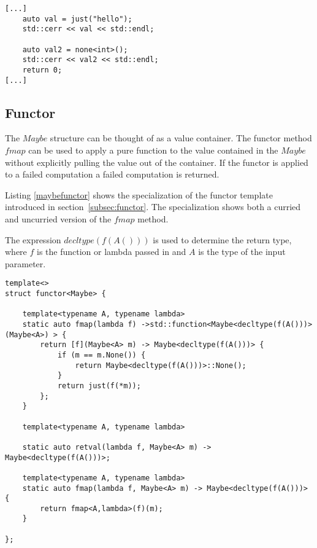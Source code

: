 \documentclass[12pt,fleqn]{article}
\begin{document}
%
%
%

%
%

\begin{minipage}{\linewidth}
\begin{lstlisting}[caption=Example of the use of Maybe, label=maybeexample]
[...]
	auto val = just("hello");
	std::cerr << val << std::endl;

	auto val2 = none<int>();
	std::cerr << val2 << std::endl;
	return 0;
[...]
\end{lstlisting}
\end{minipage}

%
%
\subsection{Functor}
%
%

The $Maybe$ structure can be thought of as a value container.
The functor method $fmap$ can be used to apply a pure function to the value contained in the $Maybe$ 
without explicitly pulling the value out of the container.
If the functor is applied to a failed computation a failed computation is returned.

Listing \ref{maybefunctor} shows the specialization of the functor template introduced in section~\ref{subsec:functor}.
The specialization shows both a curried and uncurried version of the $fmap$ method.

The expression $decltype(f(A()))$ is used to determine the return type, where $f$ is the function or lambda passed in 
and $A$ is the type of the input parameter.


%
%
\begin{minipage}{\linewidth}
\begin{lstlisting}[caption=Maybe Functor, label=maybefunctor]
template<>
struct functor<Maybe> {

	template<typename A, typename lambda>
	static auto fmap(lambda f) ->std::function<Maybe<decltype(f(A()))> (Maybe<A>) > {
		return [f](Maybe<A> m) -> Maybe<decltype(f(A()))> {
			if (m == m.None()) {
				return Maybe<decltype(f(A()))>::None();
			}
			return just(f(*m));
		};
	}

	template<typename A, typename lambda>

	static auto retval(lambda f, Maybe<A> m) ->  Maybe<decltype(f(A()))>;

	template<typename A, typename lambda>
	static auto fmap(lambda f, Maybe<A> m) -> Maybe<decltype(f(A()))> {
		return fmap<A,lambda>(f)(m);
	}

};
\end{lstlisting}
\end{minipage}
%
%
%
\end{document}
